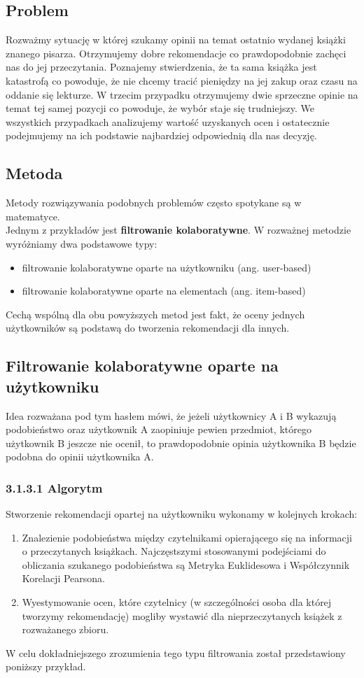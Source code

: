 \documentclass[12pt,a4paper]{report}
\begin{document}
\subsection{Problem}
Rozważmy sytuację w której szukamy opinii na temat ostatnio wydanej książki znanego pisarza. Otrzymujemy dobre rekomendacje co  prawdopodobnie zachęci nas do jej przeczytania. Poznajemy stwierdzenia, że ta sama książka jest katastrofą co powoduje, że nie  chcemy tracić pieniędzy na jej zakup oraz czasu na oddanie się lekturze. W trzecim przypadku otrzymujemy dwie sprzeczne opinie na temat tej samej pozycji co powoduje, że wybór staje się trudniejszy. We wszystkich przypadkach analizujemy wartość uzyskanych ocen i ostatecznie podejmujemy na ich podstawie najbardziej odpowiednią dla nas decyzję. 
\\
\subsection{Metoda}
Metody rozwiązywania podobnych problemów często spotykane są w matematyce. 
\\Jednym z przykładów jest \textbf{filtrowanie kolaboratywne}. W rozważnej metodzie wyróżniamy dwa podstawowe typy:
\begin{itemize}
\item filtrowanie kolaboratywne oparte na użytkowniku (ang. user-based)
\item filtrowanie kolaboratywne oparte na  elementach (ang. item-based)
\end{itemize}
Cechą wspólną dla obu powyższych metod jest fakt, że oceny jednych użytkowników są podstawą do tworzenia rekomendacji dla innych. 
\\
\subsection{Filtrowanie kolaboratywne oparte na użytkowniku}

Idea rozważana pod tym hasłem mówi, że jeżeli użytkownicy A i B wykazują podobieństwo oraz użytkownik A zaopiniuje pewien przedmiot, którego użytkownik B jeszcze nie ocenił, to prawdopodobnie opinia użytkownika B będzie podobna do opinii użytkownika A.

\subsubsection{3.1.3.1 Algorytm}
Stworzenie rekomendacji opartej na użytkowniku wykonamy w kolejnych krokach:
\begin{enumerate}
\item Znalezienie podobieństwa między czytelnikami opierającego się na informacji o przeczytanych książkach. Najczęstszymi stosowanymi podejściami do obliczania szukanego podobieństwa są Metryka Euklidesowa i Współczynnik Korelacji Pearsona.
\item Wyestymowanie ocen, które czytelnicy (w szczególności osoba dla której tworzymy rekomendację) mogliby wystawić dla nieprzeczytanych książek z rozważanego zbioru.
\end{enumerate}
W celu dokładniejszego zrozumienia tego typu filtrowania został przedstawiony poniższy przykład.
\end{document}
